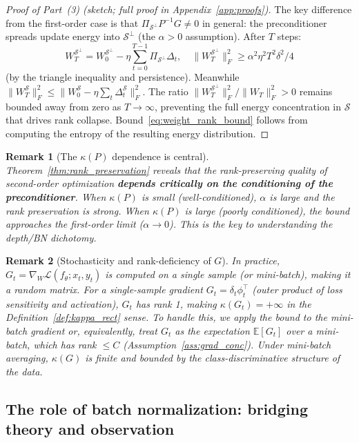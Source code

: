 \documentclass{article}
\newtheorem{remark}{Remark}
\newcommand{\EE}{\mathbb{E}}
\newcommand{\cL}{\mathcal{L}}
\newcommand{\cS}{\mathcal{S}}
\begin{document}
\begin{proof}[Proof of Part~(3) (sketch; full proof in Appendix~\ref{app:proofs})]
The key difference from the first-order case is that $\Pi_{\cS^\perp}P^{-1}G \neq 0$ in general: the preconditioner spreads update energy into $\cS^\perp$ (the $\alpha > 0$ assumption). After $T$ steps:
\[
W_T^{\cS^\perp} = W_0^{\cS^\perp} - \eta\sum_{t=0}^{T-1}\Pi_{\cS^\perp}\Delta_t, \quad \|W_T^{\cS^\perp}\|_F^2 \geq \alpha^2\eta^2 T^2\delta^2/4
\]
(by the triangle inequality and persistence). Meanwhile $\|W_T^{\cS}\|_F^2 \leq \|W_0^{\cS} - \eta\sum_t \Delta_t^{\cS}\|_F^2$. The ratio $\|W_T^{\cS^\perp}\|_F^2 / \|W_T\|_F^2 > 0$ remains bounded away from zero as $T\to\infty$, preventing the full energy concentration in $\cS$ that drives rank collapse. Bound~\eqref{eq:weight_rank_bound} follows from computing the entropy of the resulting energy distribution.
\end{proof}

\begin{remark}[The $\kappa(P)$ dependence is central]
\label{rem:kappa}
Theorem~\ref{thm:rank_preservation} reveals that the rank-preserving quality of second-order optimization \textbf{depends critically on the conditioning of the preconditioner}. When $\kappa(P)$ is small (well-conditioned), $\alpha$ is large and the rank preservation is strong. When $\kappa(P)$ is large (poorly conditioned), the bound approaches the first-order limit ($\alpha\to 0$). This is the key to understanding the depth/BN dichotomy.
\end{remark}

\begin{remark}[Stochasticity and rank-deficiency of $G$]
\label{rem:stochastic_G}
In practice, $G_t = \nabla_W\cL(f_\theta; x_t, y_t)$ is computed on a single sample (or mini-batch), making it a random matrix. For a single-sample gradient $G_t = \delta_t \phi_t^\top$ (outer product of loss sensitivity and activation), $G_t$ has rank 1, making $\kappa(G_t) = +\infty$ in the Definition~\ref{def:kappa_rect} sense. To handle this, we apply the bound to the \emph{mini-batch gradient} or, equivalently, treat $G_t$ as the expectation $\EE[G_t]$ over a mini-batch, which has rank $\leq C$ (Assumption~\ref{ass:grad_conc}). Under mini-batch averaging, $\kappa(G)$ is finite and bounded by the class-discriminative structure of the data.
\end{remark}

\subsection{The role of batch normalization: bridging theory and observation}
\end{document}
